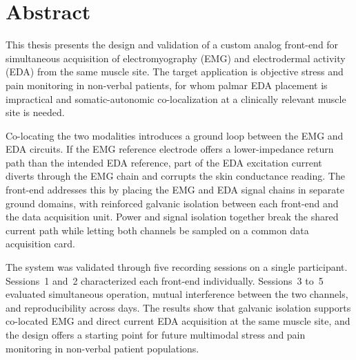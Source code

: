 \chapter*{Abstract}

This thesis presents the design and validation of a custom analog front-end for simultaneous acquisition of electromyography (EMG) and electrodermal activity (EDA) from the same muscle site. The target application is objective stress and pain monitoring in non-verbal patients, for whom palmar EDA placement is impractical and somatic-autonomic co-localization at a clinically relevant muscle site is needed.

Co-locating the two modalities introduces a ground loop between the EMG and EDA circuits. If the EMG reference electrode offers a lower-impedance return path than the intended EDA reference, part of the EDA excitation current diverts through the EMG chain and corrupts the skin conductance reading. The front-end addresses this by placing the EMG and EDA signal chains in separate ground domains, with reinforced galvanic isolation between each front-end and the data acquisition unit. Power and signal isolation together break the shared current path while letting both channels be sampled on a common data acquisition card.

The system was validated through five recording sessions on a single participant. Sessions~1 and~2 characterized each front-end individually. Sessions~3 to~5 evaluated simultaneous operation, mutual interference between the two channels, and reproducibility across days. The results show that galvanic isolation supports co-located EMG and direct current EDA acquisition at the same muscle site, and the design offers a starting point for future multimodal stress and pain monitoring in non-verbal patient populations.